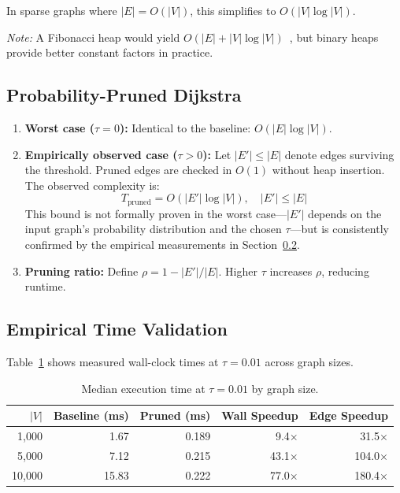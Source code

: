 In sparse graphs where $|E|=O(|V|)$, this simplifies to $O(|V|\log|V|)$.

\textit{Note:} A Fibonacci heap would yield $O(|E|+|V|\log|V|)$~\citep{fredman1987fibonacci}, but binary heaps provide better constant factors in practice.

\subsection{Probability-Pruned Dijkstra}

\begin{enumerate}
    \item \textbf{Worst case ($\tau=0$):} Identical to the baseline: $O(|E|\log|V|)$.
    \item \textbf{Empirically observed case ($\tau>0$):} Let $|E'|\leq|E|$ denote edges surviving the threshold. Pruned edges are checked in $O(1)$ without heap insertion. The observed complexity is:
    \[
    T_{\text{pruned}} = O(|E'|\log|V|),\quad |E'|\leq|E|
    \]
    This bound is not formally proven in the worst case---$|E'|$ depends on the input graph's probability distribution and the chosen $\tau$---but is consistently confirmed by the empirical measurements in Section~\ref{sec:empirical_time}.
    \item \textbf{Pruning ratio:} Define $\rho = 1 - |E'|/|E|$. Higher $\tau$ increases $\rho$, reducing runtime.
\end{enumerate}

\subsection{Empirical Time Validation}
\label{sec:empirical_time}

Table~\ref{table:time_by_size} shows measured wall-clock times at $\tau=0.01$ across graph sizes.

\begin{table}[htbp]
\centering
\renewcommand{\arraystretch}{1.3}
\begin{tabular}{@{}rrrrr@{}}
\toprule
$|V|$ & \textbf{Baseline (ms)} & \textbf{Pruned (ms)} & \textbf{Wall Speedup} & \textbf{Edge Speedup} \\
\midrule
1,000  & 1.67 & 0.189 & 9.4$\times$ & 31.5$\times$ \\
5,000  & 7.12 & 0.215 & 43.1$\times$ & 104.0$\times$ \\
10,000 & 15.83 & 0.222 & 77.0$\times$ & 180.4$\times$ \\
\bottomrule
\end{tabular}
\caption[Execution time scaling by graph size]{Median execution time at $\tau=0.01$ by graph size.}
\label{table:time_by_size}
\end{table}


